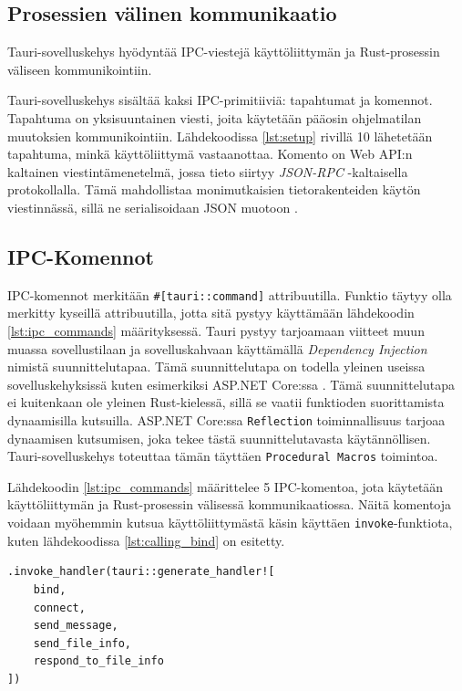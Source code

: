\documentclass[a4paper,12pt]{article}
\begin{document}
    \subsection{Prosessien välinen kommunikaatio}
    Tauri-sovelluskehys hyödyntää IPC-viestejä käyttöliittymän ja Rust-prosessin väliseen kommunikointiin.

    Tauri-sovelluskehys sisältää kaksi IPC-primitiiviä: tapahtumat ja komennot.
    Tapahtuma on yksisuuntainen viesti, joita käytetään pääosin ohjelmatilan muutoksien kommunikointiin. Lähdekoodissa \ref{lst:setup} rivillä 10 lähetetään tapahtuma, minkä käyttöliittymä vastaanottaa. Komento on Web API:n kaltainen viestintämenetelmä, jossa tieto siirtyy \textit{JSON-RPC} -kaltaisella protokollalla. Tämä mahdollistaa monimutkaisien tietorakenteiden käytön viestinnässä, sillä ne serialisoidaan JSON muotoon \cite{tauri-app}.

    \subsection{IPC-Komennot}
    IPC-komennot merkitään \lstinline{#[tauri::command]} attribuutilla. Funktio täytyy olla merkitty kyseillä attribuutilla, jotta sitä pystyy käyttämään lähdekoodin \ref{lst:ipc_commands} määrityksessä. Tauri pystyy tarjoamaan viitteet muun muassa sovellustilaan ja sovelluskahvaan käyttämällä \textit{Dependency Injection} nimistä suunnittelutapaa. Tämä suunnittelutapa on todella yleinen useissa sovelluskehyksissä kuten esimerkiksi ASP.NET Core:ssa \cite{DI_dotnet}. Tämä suunnittelutapa ei kuitenkaan ole yleinen Rust-kielessä, sillä se vaatii funktioden suorittamista dynaamisilla kutsuilla.
    ASP.NET Core:ssa \lstinline{Reflection} toiminnallisuus tarjoaa dynaamisen kutsumisen, joka tekee tästä suunnittelutavasta käytännöllisen.
    Tauri-sovelluskehys toteuttaa tämän täyttäen \lstinline{Procedural Macros} toimintoa. 


    Lähdekoodin \ref{lst:ipc_commands} määrittelee 5 IPC-komentoa, jota käytetään käyttöliittymän ja Rust-prosessin välisessä kommunikaatiossa. Näitä komentoja voidaan myöhemmin kutsua käyttöliittymästä käsin käyttäen \lstinline{invoke}-funktiota, kuten lähdekoodissa \ref{lst:calling_bind} on esitetty. \par

    \begin{lstlisting}[caption={IPC-komentojen määritys}, label={lst:ipc_commands}]
.invoke_handler(tauri::generate_handler![
    bind,
    connect,
    send_message,
    send_file_info,
    respond_to_file_info
])\end{lstlisting}
\end{document}
